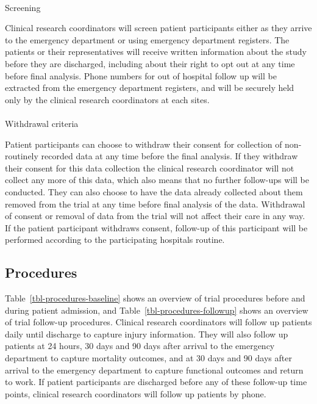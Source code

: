 \documentclass[
]{scrartcl}
\makeatletter
\let\oldparagraph\paragraph
\renewcommand{\paragraph}{
    \@ifstar
      \xxxParagraphStar
      \xxxParagraphNoStar
  }
\newcommand{\xxxParagraphStar}[1]{\oldparagraph*{#1}\mbox{}}
\newcommand{\xxxParagraphNoStar}[1]{\oldparagraph{#1}\mbox{}}
\makeatother
\begin{document}
\paragraph{Screening}\label{screening-1}

Clinical research coordinators will screen patient participants either
as they arrive to the emergency department or using emergency department
registers. The patients or their representatives will receive written
information about the study before they are discharged, including about
their right to opt out at any time before final analysis. Phone numbers
for out of hospital follow up will be extracted from the emergency
department registers, and will be securely held only by the clinical
research coordinators at each sites.

\paragraph{Withdrawal criteria}\label{withdrawal-criteria}

Patient participants can choose to withdraw their consent for collection
of non-routinely recorded data at any time before the final analysis. If
they withdraw their consent for this data collection the clinical
research coordinator will not collect any more of this data, which also
means that no further follow-ups will be conducted. They can also choose
to have the data already collected about them removed from the trial at
any time before final analysis of the data. Withdrawal of consent or
removal of data from the trial will not affect their care in any way. If
the patient participant withdraws consent, follow-up of this participant
will be performed according to the participating hospitals routine.

\subsection{Procedures}\label{procedures}

Table~\ref{tbl-procedures-baseline} shows an overview of trial
procedures before and during patient admission, and
Table~\ref{tbl-procedures-followup} shows an overview of trial follow-up
procedures. Clinical research coordinators will follow up patients daily
until discharge to capture injury information. They will also follow up
patients at 24 hours, 30 days and 90 days after arrival to the emergency
department to capture mortality outcomes, and at 30 days and 90 days
after arrival to the emergency department to capture functional outcomes
and return to work. If patient participants are discharged before any of
these follow-up time points, clinical research coordinators will follow
up patients by phone.
\end{document}
